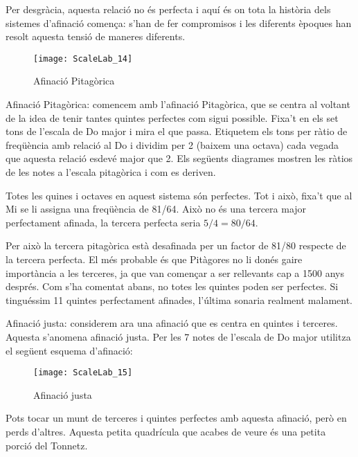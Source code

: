 Per desgràcia, aquesta relació no és perfecta i aquí és on tota la història dels sistemes d'afinació comença: s'han de fer compromisos i les diferents èpoques han resolt aquesta tensió de maneres diferents. 

\begin{figure}[h]
\centering
\texttt{[image: ScaleLab\_14]}
\caption*{Afinació Pitagòrica}
\end{figure}

Afinació Pitagòrica: comencem amb l'afinació Pitagòrica, que se centra al voltant de la idea de tenir tantes quintes perfectes com sigui possible. Fixa't en els set tons de l'escala de Do major i mira el que passa. Etiquetem els tons per ràtio de freqüència amb relació al Do i dividim per 2 (baixem una octava) cada vegada que aquesta relació esdevé major que 2. Els següents diagrames mostren les ràtios de les notes a l'escala pitagòrica i com es deriven.

Totes les quines i octaves en aquest sistema són perfectes. Tot i això, fixa't que al Mi se li assigna una freqüència de 81/64. Això no és una tercera major perfectament afinada, la tercera perfecta seria $5/4=80/64$.

Per això la tercera pitagòrica està desafinada per un factor de 81/80 respecte de la tercera perfecta. El més probable és que Pitàgores no li donés gaire importància a les terceres, ja que van començar a ser rellevants cap a 1500 anys després. Com s'ha comentat abans, no totes les quintes poden ser perfectes. Si tinguéssim 11 quintes perfectament afinades, l'última sonaria realment malament.

Afinació justa: considerem ara una afinació que es centra en quintes i terceres. Aquesta s'anomena afinació justa. Per les 7 notes de l'escala de Do major utilitza el següent esquema d'afinació:

\begin{figure}[h]
\centering
\texttt{[image: ScaleLab\_15]}
\caption*{Afinació justa}
\end{figure}

Pots tocar un munt de terceres i quintes perfectes amb aquesta afinació, però en perds d'altres. Aquesta petita quadrícula que acabes de veure és una petita porció del Tonnetz. 



